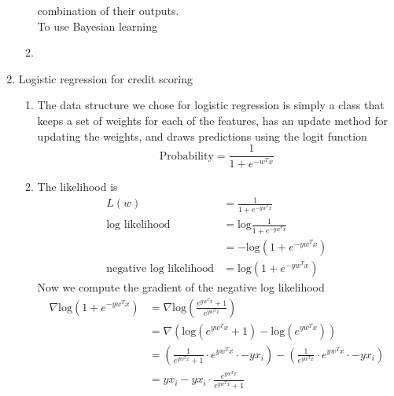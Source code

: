 \documentclass{article}
\begin{document}
\begin{enumerate}
\begin{enumerate}
                combination of their outputs. \\
                To use Bayesian learning 
            \item %
        \end{enumerate}
    \item Logistic regression for credit scoring %
        \begin{enumerate}
            \item %
                The data structure we chose for logistic regression is
                simply a class that keeps a set of weights for each of the
                features, has an update method for updating the weights,
                and draws predictions using the logit function
                \begin{equation*}
                    \text{Probability} = \frac{1}{1 + e^{-w^Tx}}
                \end{equation*}
            \item %
                The likelihood is
                \begin{align*}
                    L(w) 
                        &= \frac{1}{1 + e^{-yw^Tx}} \\
                    \text{log likelihood} 
                        &= \text{log}\frac{1}{1 + e^{-yw^Tx}} \\
                        &= -\text{log} (1 + e^{-yw^Tx}) \\
                    \text{negative log likelihood}
                        &= \text{log} (1 + e^{-yw^Tx})
                \end{align*}
                Now we compute the gradient of the negative log likelihood
                \begin{align*}
                    \nabla \text{log} (1 + e^{-yw^Tx})
                        &= \nabla \text{log} \left( \frac{e^{yw^Tx} + 1}
                            {e^{yw^Tx}} \right) \\
                        &= \nabla \left( \text{log}(e^{yw^Tx} + 1) -
                            \text{log}(e^{yw^Tx}) \right) \\
                        &= \left( \frac{1}{e^{yw^Tx} + 1} \cdot e^{yw^Tx}
                            \cdot -yx_i \right) - \left( 
                            \frac{1}{e^{yw^Tx}} \cdot e^{yw^Tx} \cdot 
                            -yx_i \right) \\
                        &= yx_i - yx_i \cdot \frac{e^{yw^Tx}}
                            {e^{yw^Tx}+1} \\

\end{align*}
\end{enumerate}
\end{enumerate}
\end{document}
